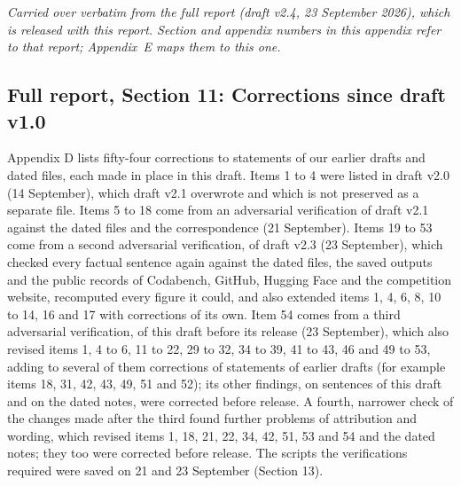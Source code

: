 \emph{Carried over verbatim from the full report (draft v2.4, 23 September 2026), which is released with this report. Section and appendix numbers in this appendix refer to that report; Appendix~E maps them to this one.}

\subsection*{Full report, Section 11: Corrections since draft v1.0}

Appendix D lists fifty-four corrections to statements of our earlier drafts and dated files, each made in place in this draft. Items 1 to 4 were listed in draft v2.0 (14 September), which draft v2.1 overwrote and which is not preserved as a separate file. Items 5 to 18 come from an adversarial verification of draft v2.1 against the dated files and the correspondence (21 September). Items 19 to 53 come from a second adversarial verification, of draft v2.3 (23 September), which checked every factual sentence again against the dated files, the saved outputs and the public records of Codabench, GitHub, Hugging Face and the competition website, recomputed every figure it could, and also extended items 1, 4, 6, 8, 10 to 14, 16 and 17 with corrections of its own. Item 54 comes from a third adversarial verification, of this draft before its release (23 September), which also revised items 1, 4 to 6, 11 to 22, 29 to 32, 34 to 39, 41 to 43, 46 and 49 to 53, adding to several of them corrections of statements of earlier drafts (for example items 18, 31, 42, 43, 49, 51 and 52); its other findings, on sentences of this draft and on the dated notes, were corrected before release. A fourth, narrower check of the changes made after the third found further problems of attribution and wording, which revised items 1, 18, 21, 22, 34, 42, 51, 53 and 54 and the dated notes; they too were corrected before release. The scripts the verifications required were saved on 21 and 23 September (Section 13).

